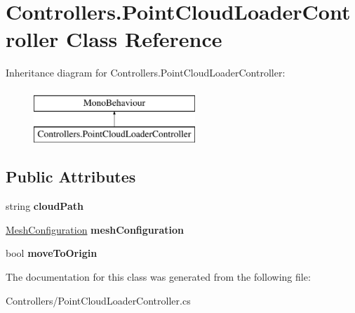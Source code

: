 \hypertarget{class_controllers_1_1_point_cloud_loader_controller}{}\section{Controllers.\+Point\+Cloud\+Loader\+Controller Class Reference}
\label{class_controllers_1_1_point_cloud_loader_controller}
Inheritance diagram for Controllers.\+Point\+Cloud\+Loader\+Controller\+:\begin{figure}[H]
\begin{center}
\leavevmode
\includegraphics[height=2.000000cm]{class_controllers_1_1_point_cloud_loader_controller}
\end{center}
\end{figure}
\subsection*{Public Attributes}
\begin{DoxyCompactItemize}
\item 
\mbox{\label{class_controllers_1_1_point_cloud_loader_controller_ab078f86da48d6f30533fc56e55afd46a}} 
string {\bfseries cloud\+Path}
\item 
\mbox{\label{class_controllers_1_1_point_cloud_loader_controller_a9bb507914cb9523f6199752ea6f94408}} 
\hyperlink{class_object_creation_1_1_mesh_configuration}{Mesh\+Configuration} {\bfseries mesh\+Configuration}
\item 
\mbox{\label{class_controllers_1_1_point_cloud_loader_controller_a44e6b8b4c81612f9376d587033b4220f}} 
bool {\bfseries move\+To\+Origin}
\end{DoxyCompactItemize}


The documentation for this class was generated from the following file\+:\begin{DoxyCompactItemize}
\item 
Controllers/Point\+Cloud\+Loader\+Controller.\+cs\end{DoxyCompactItemize}
